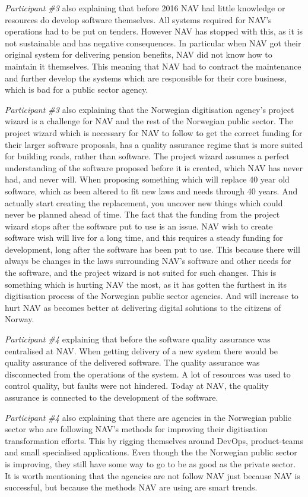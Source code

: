 \textit{Participant \#3} also explaining that before 2016 NAV had little knowledge or resources do develop software themselves. All systems required for NAV's operations had to be put on tenders. However NAV has stopped with this, as it is not sustainable and has negative consequences. In particular when NAV got their original system for delivering pension benefits, NAV did not know how to maintain it themselves. This meaning that NAV had to contract the maintenance and further develop the systems which are responsible for their core business, which is bad for a public sector agency.

\textit{Participant \#3} also explaining that the Norwegian digitisation agency's project wizard is a challenge for NAV and the rest of the Norwegian public sector. The project wizard which is necessary for NAV to follow to get the correct funding for their larger software proposals, has a quality assurance regime that is more suited for building roads, rather than software. The project wizard assumes a perfect understanding of the software proposed before it is created, which NAV has never had, and never will. When proposing something which will replace 40 year old software, which as been altered to fit new laws and needs through 40 years. And actually start creating the replacement, you uncover new things which could never be planned ahead of time. The fact that the funding from the project wizard stops after the software put to use is an issue. NAV wish to create software wish will live for a long time, and this requires a steady funding for development, long after the software has been put to use. This because there will always be changes in the laws surrounding NAV's software and other needs for the software, and the project wizard is not suited for such changes. This is something which is hurting NAV the most, as it has gotten the furthest in its digitisation process of the Norwegian public sector agencies. And will increase to hurt NAV as becomes better at delivering digital solutions to the citizens of Norway.

\textit{Participant \#4} explaining that before the software quality assurance was centralised at NAV. When getting delivery of a new system there would be quality assurance of the delivered software. The quality assurance was disconnected from the operations of the system. A lot of resources was used to control quality, but faults were not hindered. Today at NAV, the quality assurance is connected to the development of the software.

\textit{Participant \#4} also explaining that there are agencies in the Norwegian public sector who are following NAV's methods for improving their digitisation transformation efforts. This by rigging themselves around DevOps, product-teams and small specialised applications. Even though the the Norwegian public sector is improving, they still have some way to go to be as good as the private sector. It is worth mentioning that the agencies are not follow NAV just because NAV is successful, but because the methods NAV are using are smart trends.

